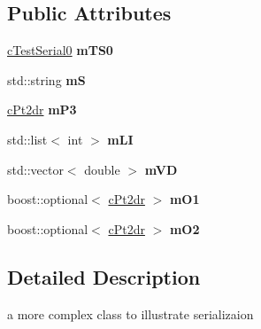 \subsection*{Public Attributes}
\begin{DoxyCompactItemize}
\item 
\hyperlink{classMMVII_1_1cTestSerial0}{c\+Test\+Serial0} {\bfseries m\+T\+S0}\hypertarget{classMMVII_1_1cTestSerial1_a17cd4f1492ffc5c904b5883d2bf69163}{}\label{classMMVII_1_1cTestSerial1_a17cd4f1492ffc5c904b5883d2bf69163}

\item 
std\+::string {\bfseries mS}\hypertarget{classMMVII_1_1cTestSerial1_a9a862f44d29d48f3f45c36c7ab0b3f8f}{}\label{classMMVII_1_1cTestSerial1_a9a862f44d29d48f3f45c36c7ab0b3f8f}

\item 
\hyperlink{classMMVII_1_1cPt2d}{c\+Pt2dr} {\bfseries m\+P3}\hypertarget{classMMVII_1_1cTestSerial1_a0c742d6e149539381adb5bebf10ab8f1}{}\label{classMMVII_1_1cTestSerial1_a0c742d6e149539381adb5bebf10ab8f1}

\item 
std\+::list$<$ int $>$ {\bfseries m\+LI}\hypertarget{classMMVII_1_1cTestSerial1_a5c7a03c375b900d4dff7b2d03f565768}{}\label{classMMVII_1_1cTestSerial1_a5c7a03c375b900d4dff7b2d03f565768}

\item 
std\+::vector$<$ double $>$ {\bfseries m\+VD}\hypertarget{classMMVII_1_1cTestSerial1_a34e6feb456dd04634dab2f2c6c87cb3b}{}\label{classMMVII_1_1cTestSerial1_a34e6feb456dd04634dab2f2c6c87cb3b}

\item 
boost\+::optional$<$ \hyperlink{classMMVII_1_1cPt2d}{c\+Pt2dr} $>$ {\bfseries m\+O1}\hypertarget{classMMVII_1_1cTestSerial1_ae6e8d60e6f4321c17b0a1cf00c8e8122}{}\label{classMMVII_1_1cTestSerial1_ae6e8d60e6f4321c17b0a1cf00c8e8122}

\item 
boost\+::optional$<$ \hyperlink{classMMVII_1_1cPt2d}{c\+Pt2dr} $>$ {\bfseries m\+O2}\hypertarget{classMMVII_1_1cTestSerial1_aac25ba20d01a1627d7590aa6f9187499}{}\label{classMMVII_1_1cTestSerial1_aac25ba20d01a1627d7590aa6f9187499}

\end{DoxyCompactItemize}


\subsection{Detailed Description}
a more complex class to illustrate serializaion 

